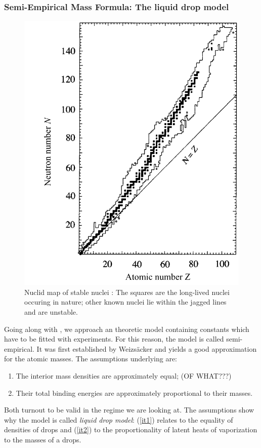 \subsubsection{Semi-Empirical Mass Formula: The liquid drop model}
\begin{figure}[htpb]
    \centering
    \includegraphics[width=0.6\linewidth]{figures/nuclidmap}
    \caption{Nuclid map of stable nuclei \cite{Hooshyar}: The squares are the long-lived nuclei
    occuring in nature; other known nuclei lie within the jagged lines and are unstable.}
    \label{fig:nuclidmap}
\end{figure}
\label{ssub:Semi-Empirical Mass Formula: The Liquid Drop Model}
Going along with  \cite{Hooshyar}, we approach an theoretic model containing constants which
have to be fitted with experiments. For this reason, the model is called semi-empirical. 
It was first established by Weizsäcker and yields a 
good approximation for the atomic masses. The assumptions underlying are:
\begin{enumerate}
    \item The interior mass densities are approximately equal; (OF WHAT???)
        \label{it1}
    \item Their total binding energies are approximately proportional to their masses.
        \label{it2}
\end{enumerate}
Both turnout to be valid in the regime we are looking at.
The assumptions show why the model is called \emph{liquid drop model}: (\ref{it1}) relates to the equality of densities
of drops and (\ref{it2}) to the proportionality of latent heats of vaporization to the masses of a drops. 

